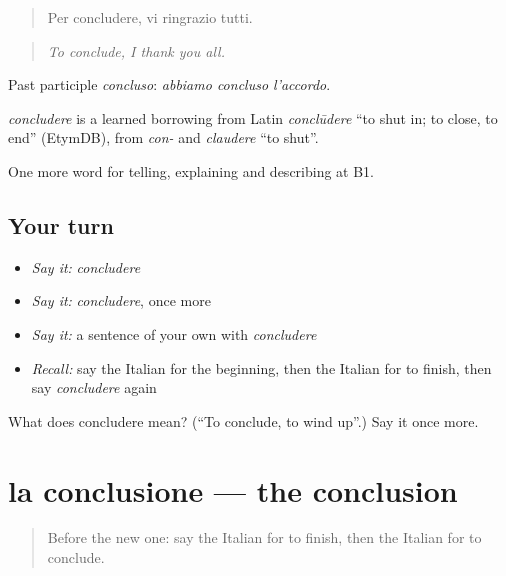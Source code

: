 \begin{quote}
Per concludere, vi ringrazio tutti.
\end{quote}

\begin{quote}
\emph{To conclude, I thank you all.}
\end{quote}

Past participle \emph{concluso}: \emph{abbiamo concluso l'accordo}.

\begin{cousinweb}
\emph{concludere} is a learned borrowing from Latin \emph{conclūdere} \textquotedblleft{}to shut in; to close, to end\textquotedblright{} (EtymDB), from \emph{con-} and \emph{claudere} \textquotedblleft{}to shut\textquotedblright{}.
\end{cousinweb}

\begin{grammarlens}[title={What you've built}]
One more word for telling, explaining and describing at B1.
\end{grammarlens}

\subsection*{Your turn}
\begin{itemize}
\raggedright
  \item \emph{Say it:} \emph{concludere}
  \item \emph{Say it:} \emph{concludere}, once more
  \item \emph{Say it:} a sentence of your own with \emph{concludere}
  \item \emph{Recall:} say the Italian for the beginning, then the Italian for to finish, then say \emph{concludere} again
\end{itemize}

\begin{tcolorbox}[breakable,colback=teal!4,colframe=teal!35!black,title={Before you move on}]
What does concludere mean? (\textquotedblleft{}To conclude, to wind up\textquotedblright{}.) Say it once more.
\end{tcolorbox}
\section[la conclusione]{la conclusione — the conclusion}

\label{lesson:IT-C278-conclusione}



\begin{quote}
Before the new one: say the Italian for to finish, then the Italian for to conclude.
\end{quote}

